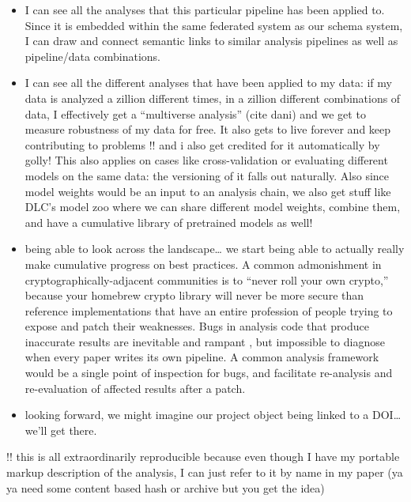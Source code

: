 \documentclass[10pt]{tufte-book}
\begin{document}
\begin{itemize}
\begin{itemize}
  \item
    I can see all the analyses that this particular pipeline has been
    applied to. Since it is embedded within the same federated system as
    our schema system, I can draw and connect semantic links to similar
    analysis pipelines as well as pipeline/data combinations.
  \item
    I can see all the different analyses that have been applied to my
    data: if my data is analyzed a zillion different times, in a zillion
    different combinations of data, I effectively get a ``multiverse
    analysis'' (cite dani) and we get to measure robustness of my data
    for free. It also gets to live forever and keep contributing to
    problems !! and i also get credited for it automatically by golly!
    This also applies on cases like cross-validation or evaluating
    different models on the same data: the versioning of it falls out
    naturally. Also since model weights would be an input to an analysis
    chain, we also get stuff like DLC's model zoo where we can share
    different model weights, combine them, and have a cumulative library
    of pretrained models as well!
  \item
    being able to look across the landscape\ldots{} we start being able
    to actually really make cumulative progress on best practices. A
    common admonishment in cryptographically-adjacent communities is to
    ``never roll your own crypto,'' because your homebrew crypto library
    will never be more secure than reference implementations that have
    an entire profession of people trying to expose and patch their
    weaknesses. Bugs in analysis code that produce inaccurate results
    are inevitable and rampant \citep{millerScientistNightmareSoftware2006, soergelRampantSoftwareErrors2015, eklundClusterFailureWhy2016a, bhandarineupaneCharacterizationLeptazolinesPolar2019} , but
    impossible to diagnose when every paper writes its own pipeline. A
    common analysis framework would be a single point of inspection for
    bugs, and facilitate re-analysis and re-evaluation of affected
    results after a patch.
  \item
    looking forward, we might imagine our project object being linked to
    a DOI\ldots{} we'll get there.
  \end{itemize}
\end{itemize}

!! this is all extraordinarily reproducible because even though I have
my portable markup description of the analysis, I can just refer to it
by name in my paper (ya ya need some content based hash or archive but
you get the idea)
\end{document}
